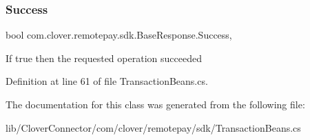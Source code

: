 \mbox{\label{classcom_1_1clover_1_1remotepay_1_1sdk_1_1_base_response_a26eb8731f844ac210c003aef421edcb0}} 
\subsubsection{\texorpdfstring{Success}{Success}}
{\footnotesize\ttfamily bool com.\+clover.\+remotepay.\+sdk.\+Base\+Response.\+Success\hspace{0.3cm}{\ttfamily [get]}, {\ttfamily [set]}}



If true then the requested operation succeeded 



Definition at line 61 of file Transaction\+Beans.\+cs.



The documentation for this class was generated from the following file\+:\begin{DoxyCompactItemize}
\item 
lib/\+Clover\+Connector/com/clover/remotepay/sdk/Transaction\+Beans.\+cs\end{DoxyCompactItemize}
